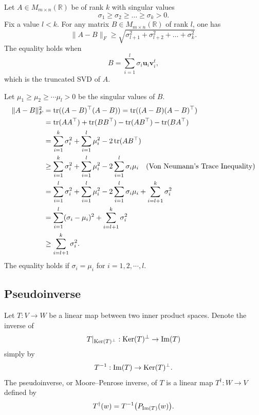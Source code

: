 \begin{theorem}
Let $A\in M_{m\times n}(\mathbb{R})$ be of rank $k$ with singular values
\[
\sigma_1\ge \sigma_2\ge \dots\ge \sigma_k>0.
\]
Fix a value $l<k$.
For any matrix $B\in M_{m\times n}(\mathbb{R})$ of rank $l$, one has
\[
\|A-B\|_F
\ge
\sqrt{\sigma_{l+1}^2+\sigma_{l+2}^2+\dots+\sigma_k^2}.
\]
The equality holds when
\[
B=
\sum_{i=1}^{l}
\sigma_i\mathbf{u}_i\mathbf{v}_i^t,
\]
which is the truncated SVD of $A$.
\end{theorem}

\begin{pfbox}
Let $\mu_1\ge\mu_2\ge\cdots\mu_l>0$ be the singular values of $B$.
\begin{align*}
    \|A-B\|^2_F &= \operatorname{tr}((A-B)^\top(A-B)) = \operatorname{tr}((A-B)(A-B)^\top)\\
                &= \operatorname{tr}(AA^\top) + \operatorname{tr}(BB^\top) -\operatorname{tr}(AB^\top)-\operatorname{tr}(BA^\top)\\
                &= \sum_{i=1}^{k}\sigma_i^2 + \sum_{i=1}^{l}\mu_i^2-2\operatorname{tr}(AB^\top)\\
                &\ge \sum_{i=1}^{k}\sigma_i^2 + \sum_{i=1}^{l}\mu_i^2-2\sum_{i=1}^{l}\sigma_i\mu_i \quad \text{(Von Neumann's Trace Inequality)}\\
                &=\sum_{i=1}^{l}\sigma_i^2 + \sum_{i=1}^{l}\mu_i^2-2\sum_{i=1}^{l}\sigma_i\mu_i + \sum_{i=l+1}^{k}\sigma_i^2\\
                &=\sum_{i=1}^{l}(\sigma_i-\mu_i)^2 + \sum_{i=l+1}^{k}\sigma_i^2\\
                &\ge \sum_{i=l+1}^{k}\sigma_i^2.
\end{align*}
The equality holds if $\sigma_i=\mu_i$ for $i=1,2,\cdots,l.$
\end{pfbox}



\subsection{Pseudoinverse}

\begin{definition}
Let $T:V\rightarrow W$ be a linear map between two inner product spaces.
Denote the inverse of
\[
T|_{\operatorname{Ker}(T)^\perp}:
\operatorname{Ker}(T)^\perp
\rightarrow
\operatorname{Im}(T)
\]
simply by
\[
T^{-1}:
\operatorname{Im}(T)
\rightarrow
\operatorname{Ker}(T)^\perp.
\]
The pseudoinverse, or Moore--Penrose inverse, of $T$ is a linear map 
$T^\dagger:W\rightarrow V$ defined by
\[
T^\dagger(w)
=
T^{-1}\bigl(P_{\operatorname{Im}(T)}(w)\bigr).
\]
\end{definition}

